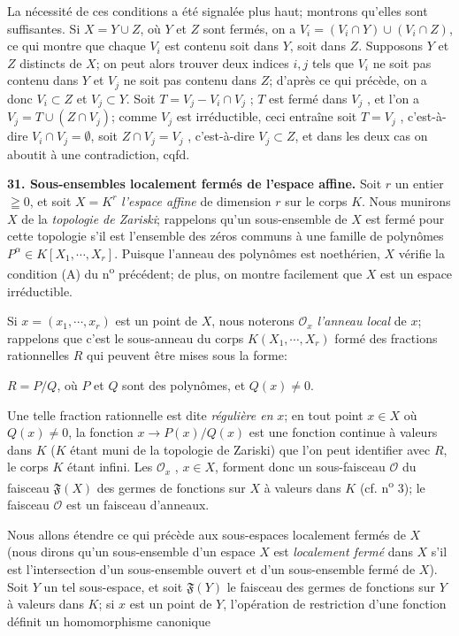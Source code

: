 
La nécessité de ces conditions a été signalée plus haut; montrons qu'elles sont suffisantes. Si $X = Y \cup Z$, où $Y$ et $Z$ sont fermés, on a $V_i = (V_i \cap Y) \cup (V_i \cap Z)$, ce qui montre que chaque $V_i$ est contenu soit dans $Y$, soit dans $Z$. Supposons $Y$ et $Z$ distincts de $X$; on peut alors trouver deux indices $i, j$ tels que $V_i$ ne soit pas contenu dans $Y$ et $V_j$ ne soit pas contenu dans $Z$; d'après ce qui précède, on a donc $V_i \subset Z$ et $V_j \subset Y$. Soit $T = V_j - V_i \cap V_j$ ; $T$ est fermé dans $V_j$ , et l'on a $V_j = T \cup (Z \cap V_j)$; comme $V_j$ est irréductible, ceci entraîne soit $T = V_j$ , c'est-à-dire $V_i \cap V_j = \emptyset$, soit $Z \cap V_j = V_j$ , c'est-à-dire $V_j \subset Z$, et dans les deux cas on aboutit à une contradiction, cqfd.

\textbf{31. Sous-ensembles localement fermés de l'espace affine.} Soit $r$ un entier $\geqq 0$, et soit $X = K^r$ \textit{l'espace affine} de dimension $r$ sur le corps $K$. Nous munirons $X$ de la \textit{topologie de Zariski}; rappelons qu'un sous-ensemble de $X$ est fermé pour cette topologie s'il est l'ensemble des zéros communs à une famille de polynômes $P^\alpha \in K[X_1 , \cdots , X_r]$. Puisque l'anneau des polynômes est noethérien, $X$ vérifie la condition (A) du n\textsuperscript{o} précédent; de plus, on montre facilement que $X$ est un espace irréductible.

Si $x = (x_1 , \cdots , x_r)$ est un point de $X$, nous noterons $\mathcal{O}_x$ \textit{l'anneau local} de $x$; rappelons que c'est le sous-anneau du corps $K(X_1 , \cdots , X_r)$ formé des fractions rationnelles $R$ qui peuvent être mises sous la forme:

$R = P/Q$, où $P$ et $Q$ sont des polynômes, et $Q(x) \neq 0$.

Une telle fraction rationnelle est dite \textit{régulière en} $x$; en tout point $x \in X$ où $Q(x) \neq 0$, la fonction $x \to P(x)/Q(x)$ est une fonction continue à valeurs dans $K$ ($K$ étant muni de la topologie de Zariski) que l'on peut identifier avec $R$, le corps $K$ étant infini. Les $\mathcal{O}_x$ , $x \in X$, forment donc un sous-faisceau $\mathcal{O}$ du faisceau $\mathfrak{F}(X)$ des germes de fonctions sur $X$ à valeurs dans $K$ (cf. n\textsuperscript{o} 3); le faisceau $\mathcal{O}$ est un faisceau d'anneaux.

Nous allons étendre ce qui précède aux sous-espaces localement fermés de $X$ (nous dirons qu'un sous-ensemble d'un espace $X$ est \textit{localement fermé} dans $X$ s'il est l'intersection d'un sous-ensemble ouvert et d'un sous-ensemble fermé de $X$). Soit $Y$ un tel sous-espace, et soit $\mathfrak{F}(Y)$ le faisceau des germes de fonctions sur $Y$ à valeurs dans $K$; si $x$ est un point de $Y$, l'opération de restriction d'une fonction définit un homomorphisme canonique

